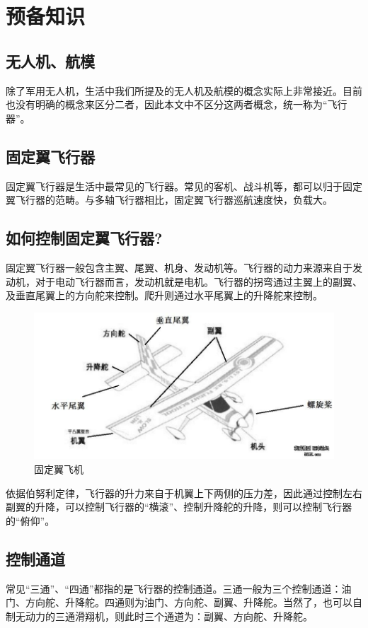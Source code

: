 \documentclass{article}
\begin{document}
	\author{北京邮电大学 机器人队}
	\tableofcontents
	\pagebreak
	
\section{预备知识}
\subsection{无人机、航模}
除了军用无人机，生活中我们所提及的无人机及航模的概念实际上非常接近。目前也没有明确的概念来区分二者，因此本文中不区分这两者概念，统一称为“飞行器”。
\subsection{固定翼飞行器}
固定翼飞行器是生活中最常见的飞行器。常见的客机、战斗机等，都可以归于固定翼飞行器的范畴。与多轴飞行器相比，固定翼飞行器巡航速度快，负载大。
\subsection{如何控制固定翼飞行器?}
固定翼飞行器一般包含主翼、尾翼、机身、发动机等。飞行器的动力来源来自于发动机，对于电动飞行器而言，发动机就是电机。飞行器的拐弯通过主翼上的副翼、及垂直尾翼上的方向舵来控制。爬升则通过水平尾翼上的升降舵来控制。

\begin{figure}[ht]
\centering
\includegraphics[scale=0.4]{固定翼.jpg}
\caption{固定翼飞机}
\label{fig:label}
\end{figure}


依据伯努利定律，飞行器的升力来自于机翼上下两侧的压力差，因此通过控制左右副翼的升降，可以控制飞行器的“横滚”、控制升降舵的升降，则可以控制飞行器的“俯仰”。

\subsection{控制通道}
常见“三通”、“四通”都指的是飞行器的控制通道。三通一般为三个控制通道：油门、方向舵、升降舵。四通则为油门、方向舵、副翼、升降舵。当然了，也可以自制无动力的三通滑翔机，则此时三个通道为：副翼、方向舵、升降舵。
\end{document}
